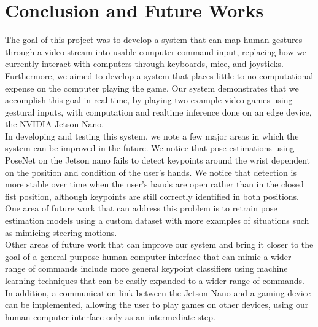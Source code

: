 \documentclass[10pt,twocolumn,letterpaper]{article}
\begin{document}
\section{Conclusion and Future Works}
The goal of this project was to develop a system that can map human gestures through a video 
stream into usable computer command input, replacing how we currently interact with computers 
through keyboards, mice, and joysticks. Furthermore, we aimed to develop a system that 
places little to no computational expense on the computer playing the game. 
Our system demonstrates that we accomplish this goal 
in real time, by playing two example video games using gestural inputs, with computation 
and realtime inference done on an edge device, the NVIDIA Jetson Nano.\\

In developing and testing this system, we note a few major areas in which the system can 
be improved in the future. We notice that pose estimations using PoseNet on the Jetson nano 
fails to detect keypoints around the wrist dependent on the position and condition of the user's 
hands. We notice that detection is more stable over time when the user's hands are open rather than in the 
closed fist position, although keypoints are still correctly identified in both positions. One 
area of future work that can address this problem is to retrain pose estimation models using a 
custom dataset with more examples of situations such as mimicing steering motions.\\

Other areas of future work that can improve our system and bring it closer to the goal of a 
general purpose human computer interface that can mimic a wider range of commands include more 
general keypoint classifiers using machine learning techniques that can be easily expanded 
to a wider range of commands. In addition, a communication link between the Jetson Nano and 
a gaming device can be implemented, allowing the user to play games on other devices, using our 
human-computer interface only as an intermediate step.

{\small


}
\end{document}
